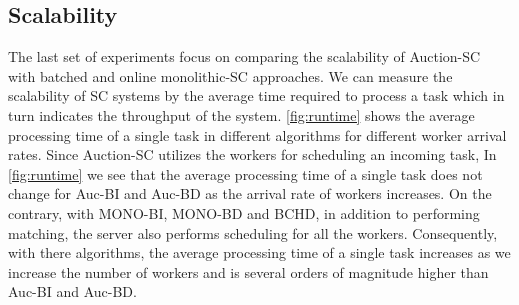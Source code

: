 \subsection{Scalability}
\label{subsec:exp_scale}
The last set of experiments focus on comparing the scalability of Auction-SC with batched and online monolithic-SC approaches. We can measure the scalability of SC systems by the average time required to process a task which in turn indicates the throughput of the system. \cref{fig:runtime} shows the average processing time of a single task in different algorithms for different worker arrival rates. Since Auction-SC utilizes the workers for scheduling an incoming task, In \cref{fig:runtime} we see that the average processing time of a single task does not change for Auc-BI and Auc-BD as the arrival rate of workers increases. On the contrary, with MONO-BI, MONO-BD and BCHD, in addition to performing matching, the server also performs scheduling for all the workers. Consequently, with there algorithms, the average processing time of a single task increases as we increase the number of workers and is several orders of magnitude higher than Auc-BI and Auc-BD.\\

